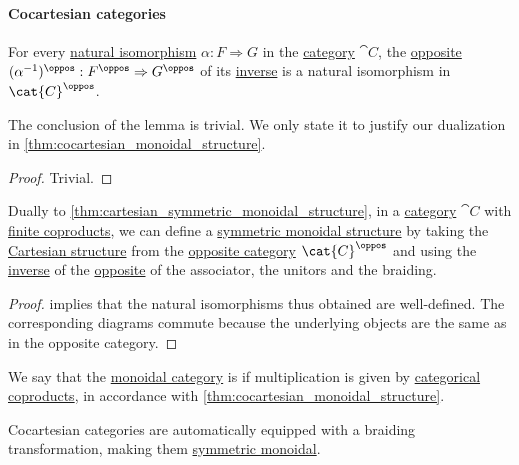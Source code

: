\paragraph{Cocartesian categories}

\begin{lemma}\label{thm:inverse_opposite_natural_isomorphism}
  For every \hyperref[def:natural_isomorphism]{natural isomorphism} \( \alpha: F \Rightarrow G \) in the \hyperref[def:category]{category} \( \cat{C} \), the \hyperref[def:opposite_natural_transformation]{opposite} \( {(\alpha^{-1})^\oppos: F^\oppos \Rightarrow G^\oppos} \) of its \hyperref[def:morphism_invertibility/isomorphism]{inverse} is a natural isomorphism in \( \cat{C}^\oppos \).
\end{lemma}
\begin{comments}
  \item The conclusion of the lemma is trivial. We only state it to justify our dualization in \cref{thm:cocartesian_monoidal_structure}.
\end{comments}
\begin{proof}
  Trivial.
\end{proof}

\begin{proposition}\label{thm:cocartesian_monoidal_structure}
  Dually to \cref{thm:cartesian_symmetric_monoidal_structure}, in a \hyperref[def:category]{category} \( \cat{C} \) with \hyperref[def:categorical_coproduct]{finite coproducts}, we can define a \hyperref[def:symmetric_monoidal_category]{symmetric monoidal structure} by taking the \hyperref[def:cartesian_monoidal_category]{Cartesian structure} from the \hyperref[def:opposite_category]{opposite category} \( \cat{C}^\oppos \) and using the \hyperref[def:morphism_invertibility/isomorphism]{inverse} of the \hyperref[def:opposite_natural_transformation]{opposite} of the associator, the unitors and the braiding.
\end{proposition}
\begin{proof}
   implies that the natural isomorphisms thus obtained are well-defined. The corresponding diagrams commute because the underlying objects are the same as in the opposite category.
\end{proof}

\begin{definition}\label{def:cocartesian_monoidal_category}
  We say that the \hyperref[def:monoidal_category]{monoidal category} is  if multiplication is given by \hyperref[def:categorical_coproduct]{categorical coproducts}, in accordance with \cref{thm:cocartesian_monoidal_structure}.

  Cocartesian categories are automatically equipped with a braiding transformation, making them \hyperref[def:symmetric_monoidal_category]{symmetric monoidal}.
\end{definition}

